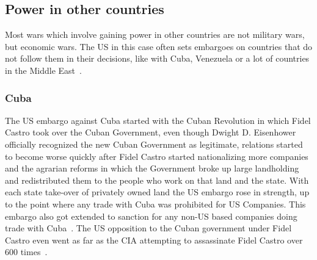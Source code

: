 \subsection{Power in other countries}
Most wars which involve gaining power in other countries are not military wars, but economic wars. The US in this case often sets embargoes on countries that do not follow them in their decisions, like with Cuba, Venezuela or a lot of countries in the Middle East~\autocite{us-treasury-embargoes}.
\subsubsection{Cuba}
The US embargo against Cuba started with the Cuban Revolution in which Fidel Castro took over the Cuban Government, even though Dwight D. Eisenhower officially recognized the new Cuban Government as legitimate, relations started to become worse quickly after Fidel Castro started nationalizing more companies and the agrarian reforms in which the Government broke up large landholding and redistributed them to the people who work on that land and the state. With each state take-over of privately owned land the US embargo rose in strength, up to the point where any trade with Cuba was prohibited for US Companies. This embargo also got extended to sanction for any non-US based companies doing trade with Cuba~\autocite{cfr-us-cuba-relations}. The US opposition to the Cuban government under Fidel Castro even went as far as the CIA attempting to assassinate Fidel Castro over 600 times~\autocite{cnn-fidel-castro-assassination}.

